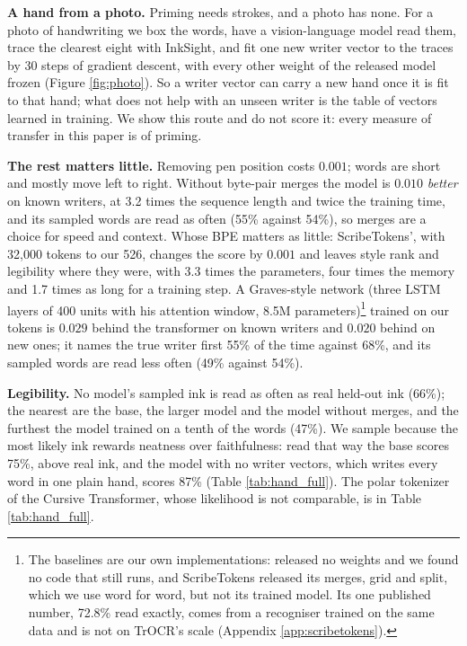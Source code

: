 \documentclass{article}
\begin{document}
\textbf{A hand from a photo.} Priming needs strokes, and a photo has none. For a photo of handwriting we box the words, have a vision-language model read them, trace the clearest eight with InkSight, and fit one new writer vector to the traces by 30 steps of gradient descent, with every other weight of the released model frozen (Figure \ref{fig:photo}). So a writer vector can carry a new hand once it is fit to that hand; what does not help with an unseen writer is the table of vectors learned in training. We show this route and do not score it: every measure of transfer in this paper is of priming.

\textbf{The rest matters little.} Removing pen position costs $0.001$; words are short and mostly move left to right. Without byte-pair merges the model is $0.010$ \emph{better} on known writers, at 3.2 times the sequence length and twice the training time, and its sampled words are read as often (55\% against 54\%), so merges are a choice for speed and context. Whose BPE matters as little: ScribeTokens', with 32,000 tokens to our 526, changes the score by $0.001$ and leaves style rank and legibility where they were, with 3.3 times the parameters, four times the memory and 1.7 times as long for a training step. A Graves-style network (three LSTM layers of 400 units with his attention window, 8.5M parameters)\footnote{\label{fn:baselines}The baselines are our own implementations: \citet{graves2014generating} released no weights and we found no code that still runs, and ScribeTokens released its merges, grid and split, which we use word for word, but not its trained model. Its one published number, 72.8\% read exactly, comes from a recogniser trained on the same data and is not on TrOCR's scale (Appendix \ref{app:scribetokens}).} trained on our tokens is $0.029$ behind the transformer on known writers and $0.020$ behind on new ones; it names the true writer first 55\% of the time against 68\%, and its sampled words are read less often (49\% against 54\%).

\textbf{Legibility.} No model's sampled ink is read as often as real held-out ink (66\%); the nearest are the base, the larger model and the model without merges, and the furthest the model trained on a tenth of the words (47\%). We sample because the most likely ink rewards neatness over faithfulness: read that way the base scores 75\%, above real ink, and the model with no writer vectors, which writes every word in one plain hand, scores 87\% (Table \ref{tab:hand_full}). The polar tokenizer of the Cursive Transformer, whose likelihood is not comparable, is in Table \ref{tab:hand_full}.
\end{document}
